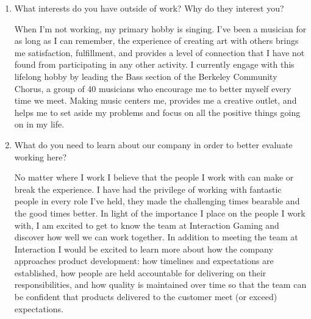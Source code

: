 \documentclass[9pt,letterpaper]{article}
\begin{document}
\begin{enumerate}
	\item What interests do you have outside of work? Why do they interest you?

		When I'm not working, my primary hobby is singing. I've been a musician for as long as I can remember, the experience of creating art with others brings me satisfaction, fulfillment, and provides a level of connection that I have not found from participating in any other activity. I currently engage with this lifelong hobby by leading the Bass section of the Berkeley Community Chorus, a group of 40 musicians who encourage me to better myself every time we meet. Making music centers me, provides me a creative outlet, and helps me to set aside my problems and focus on all the positive things going on in my life.

	\item What do you need to learn about our company in order to better evaluate working here?

		No matter where I work I believe that the people I work with can make or break the experience. I have had the privilege of working with fantastic people in every role I've held, they made the challenging times bearable and the good times better. In light of the importance I place on the people I work with, I am excited to get to know the team at Interaction Gaming and discover how well we can work together. In addition to meeting the team at Interaction I would be excited to learn more about how the company approaches product development: how timelines and expectations are established, how people are held accountable for delivering on their responsibilities, and how quality is maintained over time so that the team can be confident that products delivered to the customer meet (or exceed) expectations.
\end{enumerate}
\end{document}
